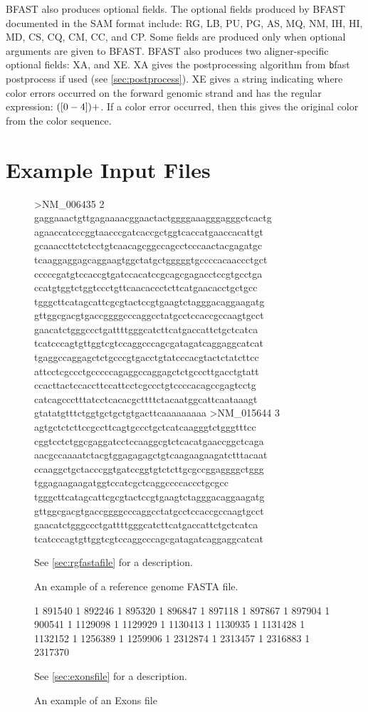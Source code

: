 \documentclass[a4paper,12pt]{book}
\newcommand{\TT}[1]{{\tt #1}} %
\newcommand{\rGFF}{reference genome FASTA file}
\begin{document}
BFAST also produces optional fields.
The optional fields produced by BFAST documented in the SAM format include: RG, LB, PU, PG, AS, MQ, NM, IH, HI, MD, CS, CQ, CM, CC, and CP.
Some fields are produced only when optional arguments are given to BFAST.
BFAST also produces two aligner-specific optional fields: XA, and XE.
XA gives the postprocessing algorithm from {\TT bfast postprocess} if used (see \autoref{sec:postprocess}).
XE gives a string indicating where color errors occurred on the forward genomic strand and has the regular expression: $([0-4\-])+$.
If a color error occurred, then this gives the original color from the color sequence.

\section{Example Input Files}
\label{sec:examplefiles}
\begin{figure}
	\centering
	\begin{boxedverbatim}
	>NM_006435 2
	gaggaaactgttgagaaaacggaactactggggaaagggagggctcactg
	agaaccatcccggtaacccgatcaccgctggtcaccatgaaccacattgt
	gcaaaccttctctcctgtcaacagcggccagcctcccaactacgagatgc
	tcaaggaggagcaggaagtggctatgctgggggtgccccacaaccctgct
	cccccgatgtccaccgtgatccacatccgcagcgagacctccgtgcctga
	ccatgtggtctggtccctgttcaacaccctcttcatgaacacctgctgcc
	tgggcttcatagcattcgcgtactccgtgaagtctagggacaggaagatg
	gttggcgacgtgaccggggcccaggcctatgcctccaccgccaagtgcct
	gaacatctgggccctgattttgggcatcttcatgaccattctgctcatca
	tcatcccagtgttggtcgtccaggcccagcgatagatcaggaggcatcat
	tgaggccaggagctctgcccgtgacctgtatcccacgtactctatcttcc
	attcctcgccctgcccccagaggccaggagctctgcccttgacctgtatt
	ccacttactccaccttccattcctcgccctgtccccacagccgagtcctg
	catcagccctttatcctcacacgcttttctacaatggcattcaataaagt
	gtatatgtttctggtgctgctgtgacttcaaaaaaaaa
	>NM_015644 3
	agtgctctcttccgccttcagtgccctgctcatcaagggtctgggtttcc
	cggtcctctggcgaggatcctccaaggcgtctcacatgaaccggctcaga
	aacgccaaaatctacgtggagagagctgtcaagaagaagatctttacaat
	ccaaggctgctacccggtgatccggtgtctcttgcgccggaggggctggg
	tggagaagaagatggtccatcgctcaggccccaccctgcgcc
	tgggcttcatagcattcgcgtactccgtgaagtctagggacaggaagatg
	gttggcgacgtgaccggggcccaggcctatgcctccaccgccaagtgcct
	gaacatctgggccctgattttgggcatcttcatgaccattctgctcatca
	tcatcccagtgttggtcgtccaggcccagcgatagatcaggaggcatcat
	\end{boxedverbatim}
	\caption{
	An example of a \rGFF{}.
	}{
	See \autoref{sec:rgfastafile} for a description.
	\label{fig:rgfastafile}
	}
\end{figure}
\begin{figure}
	\centering
	\begin{boxedverbatim}
	1   891540  1   892246
	1   895320  1   896847
	1   897118  1   897867
	1   897904  1   900541
	1   1129098 1   1129929
	1   1130413 1   1130935
	1   1131428 1   1132152
	1   1256389 1   1259906
	1   2312874 1   2313457
	1   2316883 1   2317370
	\end{boxedverbatim}
	\caption{
	An example of an Exons file
	}{
	See \autoref{sec:exonsfile} for a description.
	\label{fig:exonsfile}}
\end{figure}
\end{document}
